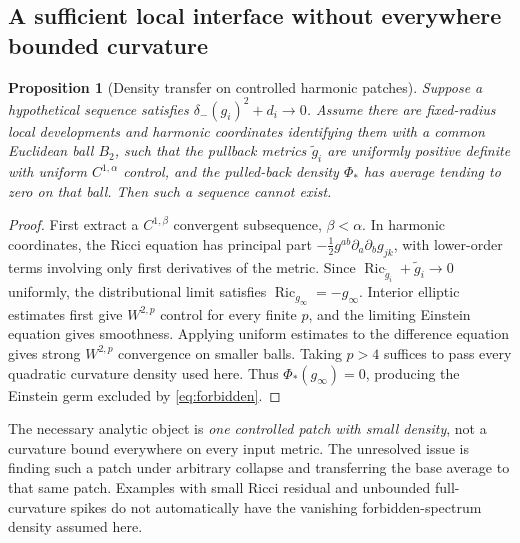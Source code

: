 \documentclass[a4paper,11pt]{article}
\numberwithin{equation}{section}
\newtheorem{proposition}[theorem]{Proposition}
\theoremstyle{definition}
\newcommand{\Ric}{\operatorname{Ric}}
\begin{document}
\subsection{A sufficient local interface without everywhere bounded curvature}
\begin{proposition}[Density transfer on controlled harmonic patches]\label{prop:minimalbridge}
Suppose a hypothetical sequence satisfies $\delta_-(g_i)^2+d_i\to0$. Assume there are fixed-radius local developments and harmonic coordinates identifying them with a common Euclidean ball $B_2$, such that the pullback metrics $\widetilde g_i$ are uniformly positive definite with uniform $C^{1,\alpha}$ control, and the pulled-back density $\Phi_*$ has average tending to zero on that ball. Then such a sequence cannot exist.
\end{proposition}
\begin{proof}
First extract a $C^{1,\beta}$ convergent subsequence, $\beta<\alpha$. In harmonic coordinates, the Ricci equation has principal part $-\frac12 g^{ab}\partial_a\partial_b g_{jk}$, with lower-order terms involving only first derivatives of the metric. Since $\Ric_{\widetilde g_i}+\widetilde g_i\to0$ uniformly, the distributional limit satisfies $\Ric_{g_\infty}=-g_\infty$. Interior elliptic estimates first give $W^{2,p}$ control for every finite $p$, and the limiting Einstein equation gives smoothness. Applying uniform estimates to the difference equation gives strong $W^{2,p}$ convergence on smaller balls. Taking $p>4$ suffices to pass every quadratic curvature density used here. Thus $\Phi_*(g_\infty)=0$, producing the Einstein germ excluded by \eqref{eq:forbidden}.
\end{proof}
The necessary analytic object is \emph{one controlled patch with small density}, not a curvature bound everywhere on every input metric. The unresolved issue is finding such a patch under arbitrary collapse and transferring the base average to that same patch. Examples with small Ricci residual and unbounded full-curvature spikes do not automatically have the vanishing forbidden-spectrum density assumed here.
\end{document}
